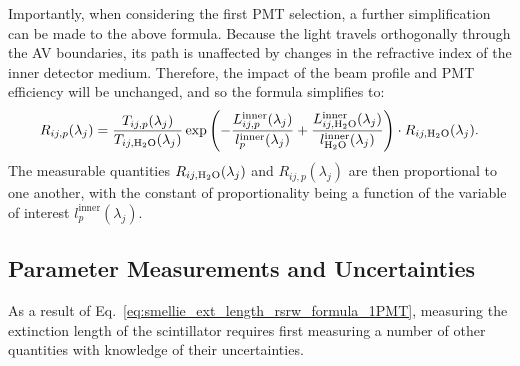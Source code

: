 Importantly, when considering the first PMT selection, a further simplification can be made to the above formula. Because the light travels orthogonally through the AV boundaries, its path is unaffected by changes in the refractive index of the inner detector medium. Therefore, the impact of the beam profile and PMT efficiency will be unchanged, and so the formula simplifies to:
\begin{equation}\label{eq:smellie_ext_length_rsrw_formula_1PMT}
    R_{ij,p}(\lambda_{j}) = 
    \frac{T_{ij,p}(\lambda_{j})}{T_{ij,\ce{H_{2}O}}(\lambda_{j})}
    \exp\left(
        -\frac{L_{ij,p}^{\mathrm{inner}}(\lambda_{j})}{l_{p}^{\mathrm{inner}}(\lambda_{j})}
        +\frac{L_{ij,\ce{H_{2}O}}^{\mathrm{inner}}(\lambda_{j})}{l_{\ce{H_{2}O}}^{\mathrm{inner}}(\lambda_{j})}
    \right)
    \cdot R_{ij,\ce{H_{2}O}}(\lambda_{j}).
\end{equation}
The measurable quantities $R_{ij,\ce{H_{2}O}}(\lambda_{j})$ and $R_{ij,p}(\lambda_{j})$ are then proportional to one another, with the constant of proportionality being a function of the variable of interest $l_{p}^{\mathrm{inner}}(\lambda_{j})$.


\subsection{Parameter Measurements and Uncertainties}\label{sec:smellie_ext_length_params_and_uncs}
As a result of Eq.~\ref{eq:smellie_ext_length_rsrw_formula_1PMT}, measuring the extinction length of the scintillator requires first measuring a number of other quantities with knowledge of their uncertainties.

